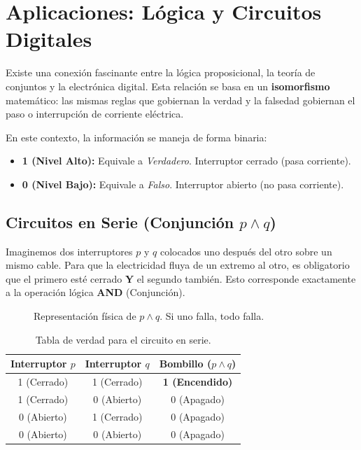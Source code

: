 \section{Aplicaciones: Lógica y Circuitos Digitales}

Existe una conexión fascinante entre la lógica proposicional, la teoría de conjuntos y la electrónica digital. Esta relación se basa en un \textbf{isomorfismo} matemático: las mismas reglas que gobiernan la verdad y la falsedad gobiernan el paso o interrupción de corriente eléctrica.

En este contexto, la información se maneja de forma binaria:
\begin{itemize}
    \item \textbf{1 (Nivel Alto):} Equivale a \textit{Verdadero}. Interruptor cerrado (pasa corriente).
    \item \textbf{0 (Nivel Bajo):} Equivale a \textit{Falso}. Interruptor abierto (no pasa corriente).
\end{itemize}

\subsection{Circuitos en Serie (Conjunción $p \land q$)}

Imaginemos dos interruptores $p$ y $q$ colocados uno después del otro sobre un mismo cable. Para que la electricidad fluya de un extremo al otro, es obligatorio que el primero esté cerrado \textbf{Y} el segundo también. Esto corresponde exactamente a la operación lógica \textbf{AND} (Conjunción).

\begin{figure}[ht]
\centering
{}
\caption{Representación física de $p \land q$. Si uno falla, todo falla.}\label{fig:serie}
\end{figure}

\begin{table}[ht]
\centering
\begin{tabular}{|c|c||c|}
\hline
\textbf{Interruptor $p$} & \textbf{Interruptor $q$} & \textbf{Bombillo ($p \land q$)} \\ \hline
1 (Cerrado) & 1 (Cerrado) & \textbf{1 (Encendido)} \\ \hline
1 (Cerrado) & 0 (Abierto) & 0 (Apagado) \\ \hline
0 (Abierto) & 1 (Cerrado) & 0 (Apagado) \\ \hline
0 (Abierto) & 0 (Abierto) & 0 (Apagado) \\ \hline
\end{tabular}
\caption{Tabla de verdad para el circuito en serie.}
\end{table}

